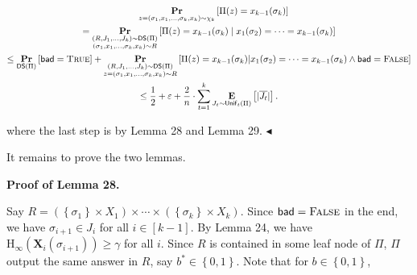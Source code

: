 \[\begin{gathered}
\displaystyle\quad\operatorname*{\mathbf{Pr}}_{z=(\sigma_{1},x_{1},\dots,\sigma_{k},x_{k})\sim\chi_{k}}\left[\Pi(z)=x_{k-1}(\sigma_{k})\right] \\
\displaystyle=\operatorname*{\mathbf{Pr}}_{\begin{subarray}{c}(R,J_{1},\dots,J_{k})\sim\mathsf{DS}(\Pi)\\
(\sigma_{1},x_{1},\dots,\sigma_{k},x_{k})\sim R\end{subarray}}\left[\Pi(z)=x_{k-1}(\sigma_{k})\;\middle|\;x_{1}(\sigma_{2})=\cdots=x_{k-1}(\sigma_{k})\right] \\
\displaystyle\leq\operatorname*{\mathbf{Pr}}_{\mathsf{DS}(\Pi)}\left[\mathsf{bad}=\textsc{True}\right]+\operatorname*{\mathbf{Pr}}_{\begin{subarray}{c}(R,J_{1},\dots,J_{k})\sim\mathsf{DS}(\Pi)\\
z=(\sigma_{1},x_{1},\dots,\sigma_{k},x_{k})\sim R\end{subarray}}\left[\Pi(z)=x_{k-1}(\sigma_{k})|x_{1}(\sigma_{2})=\cdots=x_{k-1}(\sigma_{k})\land\mathsf{bad}=\textsc{False}\right] \\
\displaystyle\leq\frac{1}{2}+\varepsilon+\frac{2}{n}\cdot\sum_{t=1}^{k}\operatorname*{\mathbf{E}}_{J_{t}\sim\mathsf{Unif}_{t}(\Pi)}\left[|\overline{J_{t}}|\right].
\end{gathered}\]


where the last step is by Lemma 28 and Lemma 29.
$\blacktriangleleft$\par




It remains to prove the two lemmas.\par





\par\medskip\noindent\textbf{Proof of Lemma 28.}\par




Say $R=(\left\{\sigma_{1}\right\}\times X_{1})\times\cdots\times(\left\{\sigma_{k}\right\}\times X_{k})$.
Since $\mathsf{bad}=\textsc{False}$ in the end,
we have $\sigma_{i+1}\in J_{i}$ for all $i\in[k-1]$.
By Lemma 24, we have $\text{H}_{\infty}(\bm{X}_{i}(\sigma_{i+1}))\geq\gamma$ for all $i$.
Since $R$ is contained in some leaf node of $\Pi$,
$\Pi$ output the same answer in $R$, say $b^{*}\in\left\{0,1\right\}$.
Note that for $b\in\left\{0,1\right\}$,\par


